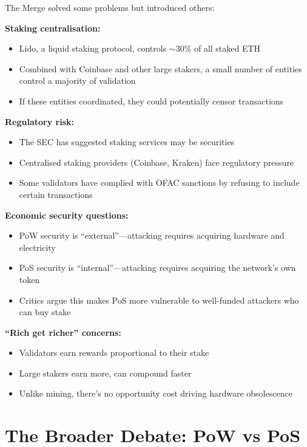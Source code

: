 \documentclass[11pt]{article}
\begin{document}
The Merge solved some problems but introduced others:

\medskip
\noindent\textbf{Staking centralisation:}
\begin{itemize}[leftmargin=*]
\item Lido, a liquid staking protocol, controls $\sim$30\% of all staked ETH
\item Combined with Coinbase and other large stakers, a small number of entities control a majority of validation
\item If these entities coordinated, they could potentially censor transactions
\end{itemize}

\medskip
\noindent\textbf{Regulatory risk:}
\begin{itemize}[leftmargin=*]
\item The SEC has suggested staking services may be securities
\item Centralised staking providers (Coinbase, Kraken) face regulatory pressure
\item Some validators have complied with OFAC sanctions by refusing to include certain transactions
\end{itemize}

\medskip
\noindent\textbf{Economic security questions:}
\begin{itemize}[leftmargin=*]
\item PoW security is ``external''---attacking requires acquiring hardware and electricity
\item PoS security is ``internal''---attacking requires acquiring the network's own token
\item Critics argue this makes PoS more vulnerable to well-funded attackers who can buy stake
\end{itemize}

\medskip
\noindent\textbf{``Rich get richer'' concerns:}
\begin{itemize}[leftmargin=*]
\item Validators earn rewards proportional to their stake
\item Large stakers earn more, can compound faster
\item Unlike mining, there's no opportunity cost driving hardware obsolescence
\end{itemize}

\section*{The Broader Debate: PoW vs PoS}
\end{document}
